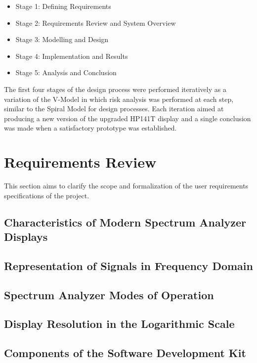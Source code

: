 \documentclass[class=report,11pt,crop=false]{standalone}
\begin{document}
	\begin{itemize}
		\item 
		Stage 1: Defining Requirements
		\item 
		Stage 2: Requirements Review and System Overview
		\item 
		Stage 3: Modelling and Design
		\item 
		Stage 4: Implementation and Results
		\item 
		Stage 5: Analysis and Conclusion 
	\end{itemize}

	The first four stages of the design process were performed iteratively as a variation of the V-Model in which risk analysis was performed at each step, similar to the Spiral Model for design processes. Each iteration aimed at producing a new version of the upgraded HP141T display and a single conclusion was made when a satisfactory prototype was established.

	\section{Requirements Review}
	
	This section aims to clarify the scope and formalization of the user requirements specifications of the project. 
		
	\subsection{Characteristics of Modern Spectrum Analyzer Displays}
	
	\subsection{Representation of Signals in Frequency Domain}
	
	\subsection{Spectrum Analyzer Modes of Operation}
	
	\subsection{Display Resolution in the Logarithmic Scale}
	
	\subsection{Components of the Software Development Kit}
	
\end{document}
